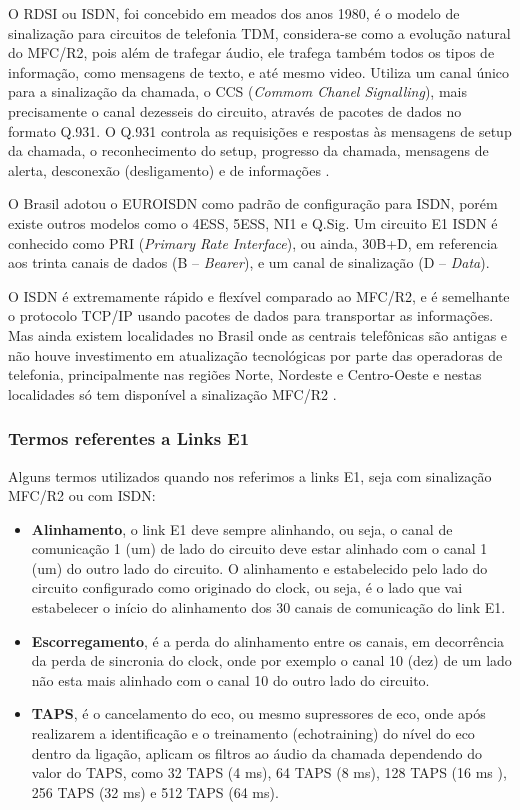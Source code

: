 O RDSI ou ISDN, foi concebido em meados dos anos 1980, é o modelo de sinalização para circuitos de telefonia TDM, considera-se como a evolução natural do MFC/R2, pois além de trafegar áudio, ele trafega também todos os tipos de informação, como mensagens de texto, e até mesmo video. Utiliza um canal único para a sinalização da chamada, o CCS (\textit{Commom Chanel Signalling}), mais precisamente o canal dezesseis do circuito, através de pacotes de dados no formato Q.931. O Q.931 controla as requisições e respostas às mensagens de setup da chamada, o reconhecimento do setup, progresso da chamada, mensagens de alerta, desconexão (desligamento) e de informações \cite{alexandrekeller2014}.

O Brasil adotou o EUROISDN como padrão de configuração para ISDN, porém existe outros modelos como o 4ESS, 5ESS, NI1 e Q.Sig. Um circuito E1 ISDN é conhecido como PRI (\textit{Primary Rate Interface}), ou ainda, 30B+D, em referencia aos trinta canais de dados (B – \textit{Bearer}), e um canal de sinalização (D – \textit{Data}).

O ISDN é extremamente rápido e flexível comparado ao MFC/R2, e é semelhante o protocolo TCP/IP usando pacotes de dados para transportar as informações. Mas ainda existem localidades no Brasil onde as centrais telefônicas são antigas e não houve investimento em atualização tecnológicas por parte das operadoras de telefonia, principalmente nas regiões Norte, Nordeste e Centro-Oeste e nestas localidades só tem disponível a sinalização MFC/R2 \cite{eduardotude2014}.

\subsubsection{Termos referentes a Links E1}
Alguns termos utilizados quando nos referimos a links E1, seja com sinalização MFC/R2 ou com ISDN: \cite{alexandrekeller2014}

\begin{itemize}
  \item \textbf{Alinhamento}, o link E1 deve sempre alinhando, ou seja, o canal de comunicação 1 (um) de lado do circuito deve estar alinhado com o canal 1 (um) do outro lado do circuito. O alinhamento e estabelecido pelo lado do circuito configurado como originado do clock, ou seja, é o lado que vai estabelecer o início do alinhamento dos 30 canais de comunicação do link E1.
  \item \textbf{Escorregamento}, é a perda do alinhamento entre os canais, em decorrência da perda de sincronia do clock, onde por exemplo o canal 10 (dez) de um lado não esta mais alinhado com o canal 10 do outro lado do circuito.
  \item \textbf{TAPS}, é o cancelamento do eco, ou mesmo supressores de eco, onde após realizarem a identificação e o treinamento (echotraining) do nível do eco dentro da ligação, aplicam os filtros ao áudio da chamada dependendo do valor do TAPS, como 32 TAPS (4 ms), 64 TAPS (8 ms), 128 TAPS (16 ms ), 256 TAPS (32 ms) e 512 TAPS (64 ms).
\end{itemize}

